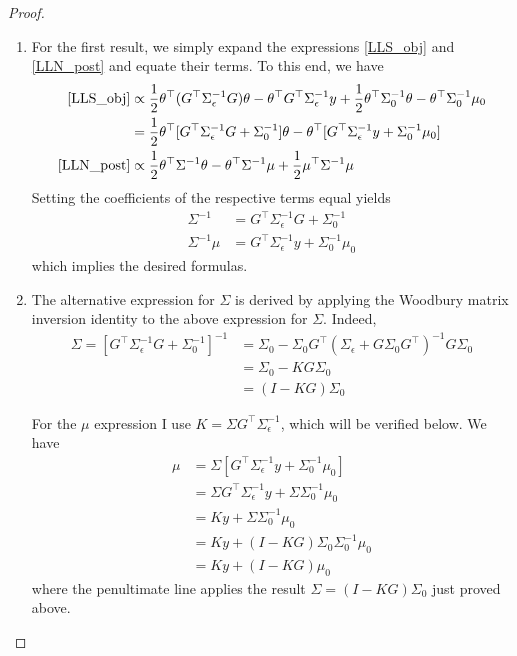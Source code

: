 \documentclass[12pt]{article}
\begin{document}
\begin{proof} 
\begin{enumerate}
\item For the first result, we simply expand the expressions \ref{LLS_obj} and \ref{LLN_post} and equate their terms. To this end, we have
\begin{align*}
\ref{LLS_obj} &\propto \frac{1}{2} \theta^\top (G^\top \Sigma^{-1}_\epsilon G) \theta - \theta^\top G^\top \Sigma_\epsilon^{-1} y + \frac{1}{2} \theta^\top \Sigma_0^{-1} \theta - \theta^\top \Sigma_0^{-1} \mu_0 \\
	             &= \frac{1}{2} \theta^\top [G^\top \Sigma_\epsilon^{-1} G + \Sigma_0^{-1}]\theta - \theta^\top [G^\top \Sigma_{\epsilon}^{-1}y + \Sigma_0^{-1}\mu_0] \\
\ref{LLN_post} &\propto \frac{1}{2} \theta^\top \Sigma^{-1} \theta - \theta^\top \Sigma^{-1} \mu + \frac{1}{2} \mu^\top \Sigma^{-1} \mu 	           
\end{align*}
Setting the coefficients of the respective terms equal yields
\begin{align*}
\Sigma^{-1} &= G^\top \Sigma_{\epsilon}^{-1}G + \Sigma_0^{-1} \\
\Sigma^{-1} \mu &= G^\top \Sigma_{\epsilon}^{-1}y + \Sigma_0^{-1} \mu_0
\end{align*}
which implies the desired formulas. 

\item The alternative expression for $\Sigma$ is derived by applying the Woodbury matrix inversion identity to the above expression for $\Sigma$. Indeed, 
\begin{align*}
\Sigma = \left[G^\top \Sigma_{\epsilon}^{-1}G + \Sigma_0^{-1} \right]^{-1} &= \Sigma_0 - \Sigma_0 G^\top (\Sigma_\epsilon + G \Sigma_0 G^\top)^{-1} G\Sigma_0 \\
													       &= \Sigma_0 - KG\Sigma_0 \\
													       &= (I - KG) \Sigma_0 
\end{align*}

For the $\mu$ expression I use $K = \Sigma G^\top \Sigma_{\epsilon}^{-1}$, which will be verified below. We have 
\begin{align*}
\mu &= \Sigma\left[G^\top \Sigma_{\epsilon}^{-1}y + \Sigma_0^{-1} \mu_0\right] \\
       &= \Sigma G^\top \Sigma_{\epsilon}^{-1}y + \Sigma \Sigma_0^{-1} \mu_0 \\
       &= Ky + \Sigma \Sigma_0^{-1} \mu_0 \\
       &= Ky + (I - KG)\Sigma_0  \Sigma_0^{-1} \mu_0 \\
       &= Ky + (I - KG)\mu_0
\end{align*}
where the penultimate line applies the result $\Sigma = (I - KG)\Sigma_0$ just proved above. 


\end{enumerate}
\end{proof}
\end{document}
